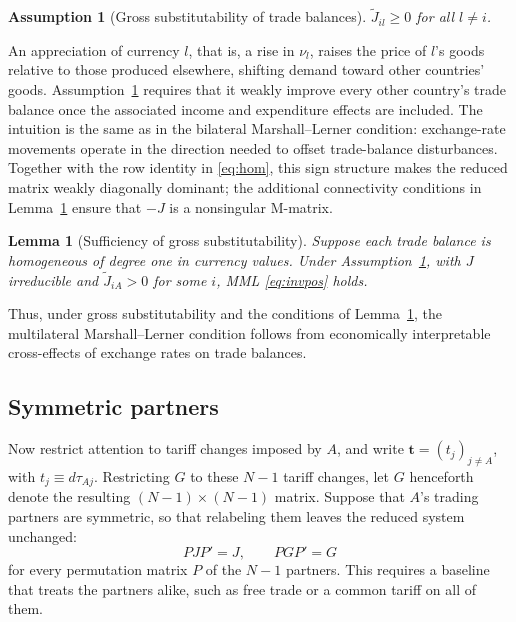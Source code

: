 \documentclass[11pt]{article}
\newtheorem{lemma}[theorem]{Lemma}
\newtheorem{assumption}{Assumption}
\begin{document}
\begin{assumption}[Gross substitutability of trade balances]\label{asm:gross-subst}
$\widetilde J_{il}\geq0$ for all $l\neq i$.
\end{assumption}

An appreciation of currency $l$, that is, a rise in $\nu_l$, raises the price of $l$'s goods relative to those produced elsewhere, shifting demand toward other countries' goods. Assumption~\ref{asm:gross-subst} requires that it weakly improve every other country's trade balance once the associated income and expenditure effects are included. The intuition is the same as in the bilateral Marshall--Lerner condition: exchange-rate movements operate in the direction needed to offset trade-balance disturbances. Together with the row identity in \eqref{eq:hom}, this sign structure makes the reduced matrix weakly diagonally dominant; the additional connectivity conditions in Lemma~\ref{lem:gs-sufficiency} ensure that $-J$ is a nonsingular M-matrix.

\begin{lemma}[Sufficiency of gross substitutability]
Suppose each trade balance is homogeneous of degree one in currency values. Under Assumption~\ref{asm:gross-subst}, with $J$ irreducible and $\widetilde J_{iA}>0$ for some $i$, MML \eqref{eq:invpos} holds.
\label{lem:gs-sufficiency}
\end{lemma}

\noindent Thus, under gross substitutability and the conditions of Lemma~\ref{lem:gs-sufficiency}, the multilateral Marshall--Lerner condition follows from economically interpretable cross-effects of exchange rates on trade balances.

\subsection{Symmetric partners}
\label{sec:exch}

Now restrict attention to tariff changes imposed by $A$, and write $\mathbf{t}=(t_j)_{j\neq A}$, with $t_j\equiv d\tau_{Aj}$. Restricting $G$ to these $N-1$ tariff changes, let $G$ henceforth denote the resulting $(N-1)\times(N-1)$ matrix. Suppose that $A$'s trading partners are symmetric, so that relabeling them leaves the reduced system unchanged:
\[
PJP'=J, \qquad PGP'=G
\]
for every permutation matrix $P$ of the $N-1$ partners. This requires a baseline that treats the partners alike, such as free trade or a common tariff on all of them.
\end{document}
